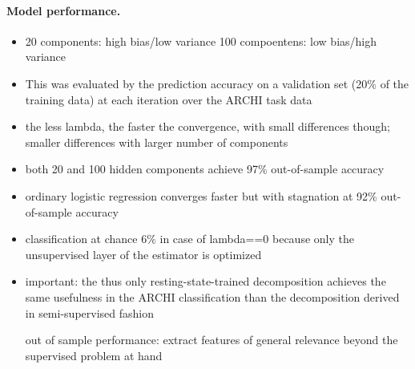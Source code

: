 \documentclass{article} %
\begin{document}
\paragraph{Model performance.}
\begin{itemize}
\item{20 components: high bias/low variance
100 compoentens: low bias/high variance}
\end{itemize}
\begin{itemize}
  \item{This was evaluated by the prediction
accuracy on a validation set (20\% of the training data) at each iteration
over the ARCHI task data}
  \item{the less lambda, the faster the convergence, with small differences
  though; smaller differences with larger number of components}
  \item{both 20 and 100 hidden components achieve 97\% out-of-sample
  accuracy}
  \item{ordinary logistic regression converges faster but with stagnation at
  92\% out-of-sample accuracy}
  \item{classification at chance 6\% in case of lambda==0 because 
  only the unsupervised layer of the estimator is optimized}
  \item{important: the thus only resting-state-trained decomposition achieves
  the same usefulness in the ARCHI classification than the
  decomposition derived in semi-supervised fashion}

out of sample performance: extract features of general relevance
beyond the supervised problem at hand
\end{itemize}
\end{document}
